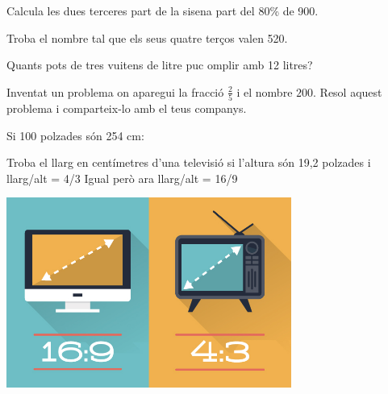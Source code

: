 \begin{mylist}
	\exer \spen  Calcula les dues terceres part de la sisena part del 80\% de 900.
 \vso

 
	\exer  \spen  Troba el nombre tal que els seus quatre terços valen 520.
 \vsoo
{}



 
	\exer  \spen  Quants pots de tres vuitens de litre puc omplir amb 12 litres?
 \vso
{}
 
	\exer  Inventat un problema on aparegui la fracció $\frac{2}{5}$ i el nombre $200$. Resol aquest problema i comparteix-lo amb el teus companys. 
	 
\redacta

\pagebreak
\mbox{}
\vspace{-1cm} 
 
 \exer \begin{minipage}[t]{0.56\textwidth}  Si 100 polzades són 254 cm:
 
\begin{tasks}
	\task Troba el llarg en centímetres d'una televisió si l'altura són 19,2 polzades i llarg/alt = 4/3
	\task Igual però ara llarg/alt = 16/9
\end{tasks}
\answers{[65.024 cm, 86.6986 cm]} 

\end{minipage}
\begin{minipage}{0.44\textwidth}
	\centering
	\vspace{0.5cm}
	\includegraphics[width=0.7\textwidth]{img-01/tvs}
\end{minipage}


\end{mylist}

